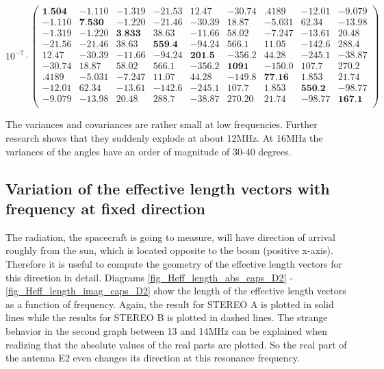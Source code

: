 \documentclass[a4paper,14pt]{extbook}
\begin{document}
\tiny
\begin{equation}\label{cov_1MHz_B}
10^{-7} \cdot \left(
\begin{array}{ccccccccc}
\textbf{1.504} & -1.110 & -1.319 & -21.53 & 12.47 & -30.74 & .4189 & -12.01 & -9.079 \\
 -1.110 & \textbf{7.530} & -1.220 & -21.46 & -30.39 & 18.87 & -5.031 & 62.34 & -13.98 \\
 -1.319 & -1.220 & \textbf{3.833} & 38.63 & -11.66 & 58.02 & -7.247 & -13.61 & 20.48 \\
 -21.56 & -21.46 & 38.63 & \textbf{559.4} & -94.24 & 566.1 & 11.05 & -142.6 & 288.4 \\
 12.47 & -30.39 & -11.66 & -94.24 & \textbf{201.5} & -356.2 & 44.28 & -245.1 & -38.87\\
 -30.74 & 18.87 & 58.02 & 566.1 & -356.2 & \textbf{1091} & -150.0 & 107.7 & 270.2 \\
 .4189 & -5.031 & -7.247 & 11.07 & 44.28 & -149.8 & \textbf{77.16} & 1.853 & 21.74 \\
 -12.01 & 62.34 & -13.61 & -142.6 & -245.1 & 107.7 & 1.853 & \textbf{550.2} & -98.77 \\
 -9.079 & -13.98 & 20.48 & 288.7 & -38.87 & 270.20 & 21.74 & -98.77 & \textbf{167.1} \\
\end{array}%
\right)
\end{equation}
\normalsize



The variances and covariances are rather small at low frequencies. Further research shows that they suddenly explode at about 12MHz. At 16MHz the variances of the angles have an order of magnitude of 30-40 degrees.

\subsection{Variation of the effective length vectors with frequency at fixed direction}

The radiation, the spacecraft is going to measure, will have direction of arrival roughly
from the sun, which is located opposite to the boom (positive
x-axis). Therefore it is useful to compute the geometry of the effective length vectors for this direction in detail. Diagrams \ref{fig_Heff_length_abs_caps_D2} - \ref{fig_Heff_length_imag_caps_D2} show the length of the effective length vectors as a function of
frequency. Again, the result for STEREO A is plotted in solid lines while the results for STEREO B is plotted in dashed lines. The strange behavior in the second graph between 13 and 14MHz can be explained when realizing that the absolute values of the real parts are plotted. So the real part of the antenna E2 even changes its direction at this resonance frequency.
\end{document}
